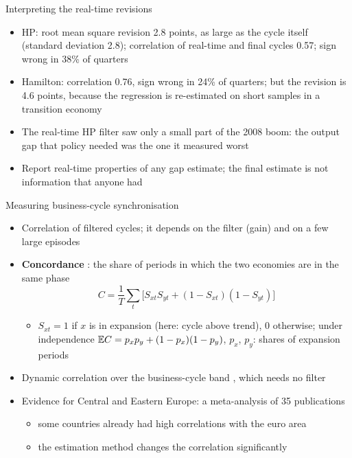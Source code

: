 \begin{frame}{Interpreting the real-time revisions}
\itemsize{\footnotesize}
\begin{itemize}
    \item HP: root mean square revision 2.8 points, as large as the cycle itself (standard deviation 2.8); correlation of real-time and final cycles 0.57; sign wrong in 38\% of quarters
    \item Hamilton: correlation 0.76, sign wrong in 24\% of quarters; but the revision is 4.6 points, because the regression is re-estimated on short samples in a transition economy
    \item The real-time HP filter saw only a small part of the 2008 boom: the output gap that policy needed was the one it measured worst
    \item Report real-time properties of any gap estimate; the final estimate is not information that anyone had
\end{itemize}
\end{frame}

\begin{frame}{Measuring business-cycle synchronisation}
\itemsize{\small}
\begin{itemize}
    \item Correlation of filtered cycles; it depends on the filter (gain) and on a few large episodes
    \item \textbf{Concordance} : the share of periods in which the two economies are in the same phase
    \[ C = \frac1T\sum_t\big[S_{xt}S_{yt} + (1 - S_{xt})(1 - S_{yt})\big] \]
    \begin{itemize}
        \item $S_{xt} = 1$ if $x$ is in expansion (here: cycle above trend), 0 otherwise; under independence $\mathbb{E} C = p_xp_y + (1 - p_x)(1 - p_y)$, $p_x$, $p_y$: shares of expansion periods
    \end{itemize}
    \item Dynamic correlation over the business-cycle band , which needs no filter
    \item Evidence for Central and Eastern Europe: a meta-analysis of 35 publications 
    \begin{itemize}
        \item some countries already had high correlations with the euro area
        \item the estimation method changes the correlation significantly
    \end{itemize}
\end{itemize}
\end{frame}

